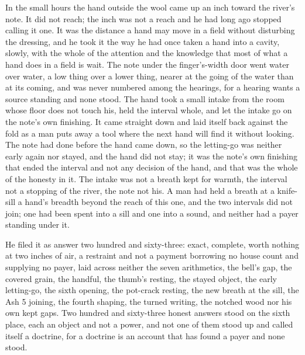 In the small hours the hand outside the wool came up an inch toward the river's note. It did not reach; the inch was not a reach and he had long ago stopped calling it one. It was the distance a hand may move in a field without disturbing the dressing, and he took it the way he had once taken a hand into a cavity, slowly, with the whole of the attention and the knowledge that most of what a hand does in a field is wait. The note under the finger's-width door went water over water, a low thing over a lower thing, nearer at the going of the water than at its coming, and was never numbered among the hearings, for a hearing wants a source standing and none stood. The hand took a small intake from the room whose floor does not touch his, held the interval whole, and let the intake go on the note's own finishing. It came straight down and laid itself back against the fold as a man puts away a tool where the next hand will find it without looking. The note had done before the hand came down, so the letting-go was neither early again nor stayed, and the hand did not stay; it was the note's own finishing that ended the interval and not any decision of the hand, and that was the whole of the honesty in it. The intake was not a breath kept for warmth, the interval not a stopping of the river, the note not his. A man had held a breath at a knife-sill a hand's breadth beyond the reach of this one, and the two intervals did not join; one had been spent into a sill and one into a sound, and neither had a payer standing under it.

He filed it as answer two hundred and sixty-three: exact, complete, worth nothing at two inches of air, a restraint and not a payment borrowing no house count and supplying no payer, laid across neither the seven arithmetics, the bell's gap, the covered grain, the handful, the thumb's resting, the stayed object, the early letting-go, the sixth opening, the pot-crack resting, the new breath at the sill, the Ash 5 joining, the fourth shaping, the turned writing, the notched wood nor his own kept gaps. Two hundred and sixty-three honest answers stood on the sixth place, each an object and not a power, and not one of them stood up and called itself a doctrine, for a doctrine is an account that has found a payer and none stood.

